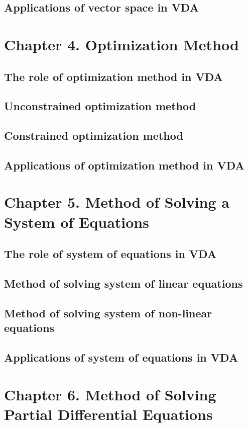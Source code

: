 \subsection{Applications of vector space in VDA}

\section{Chapter 4. Optimization Method}
\subsection{The role of optimization method in VDA}
\subsection{Unconstrained optimization method}
\subsection{Constrained optimization method}
\subsection{Applications of optimization method in VDA}

\section{Chapter 5. Method of Solving a System of Equations}
\subsection{The role of system of equations in VDA}
\subsection{Method of solving system of linear equations}
\subsection{Method of solving system of non-linear equations}
\subsection{Applications of system of equations in VDA}

\section{Chapter 6. Method of Solving Partial Differential Equations}
